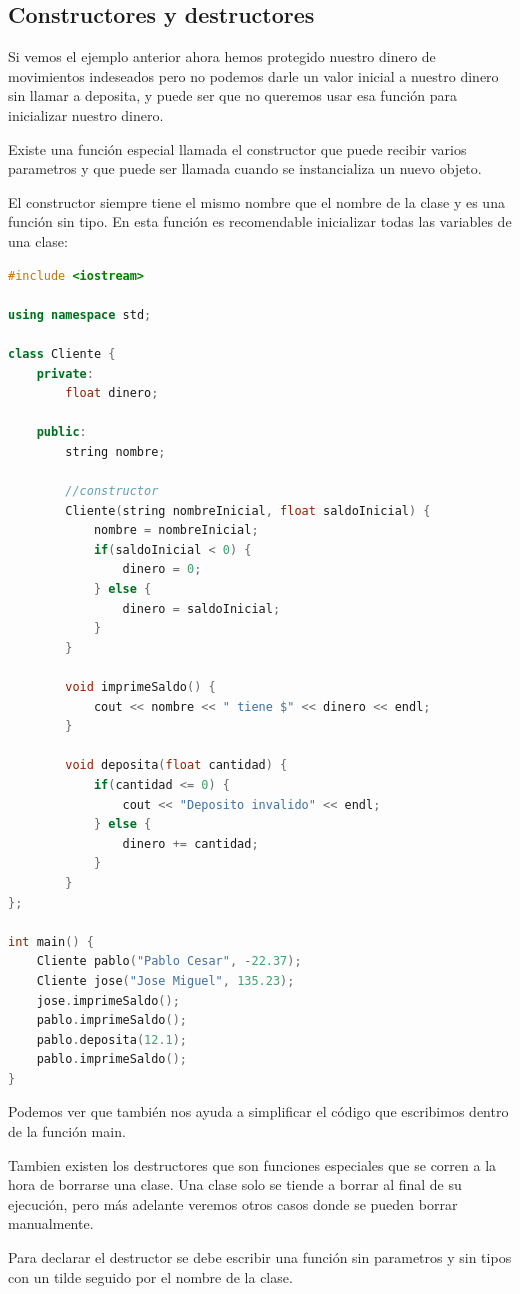 \documentclass{article}
\begin{document}
\subsection{Constructores y destructores}

Si vemos el ejemplo anterior ahora hemos protegido nuestro dinero de movimientos indeseados pero no podemos darle un valor inicial a nuestro dinero sin llamar a deposita, y puede ser que no queremos usar esa función para inicializar nuestro dinero.

Existe una función especial llamada el constructor que puede recibir varios parametros y que puede ser llamada cuando se instancializa un nuevo objeto.

El constructor siempre tiene el mismo nombre que el nombre de la clase y es una función sin tipo. En esta función es recomendable inicializar todas las variables de una clase:

\begin{lstlisting}[language=C++, title=Constructores]
#include <iostream>

using namespace std;

class Cliente {
	private:
		float dinero;

	public:
		string nombre;

		//constructor
		Cliente(string nombreInicial, float saldoInicial) {
			nombre = nombreInicial;
			if(saldoInicial < 0) {
				dinero = 0;
			} else {
				dinero = saldoInicial;
			}
		}

		void imprimeSaldo() {
			cout << nombre << " tiene $" << dinero << endl;
		}

		void deposita(float cantidad) {
			if(cantidad <= 0) {
				cout << "Deposito invalido" << endl;
			} else {
				dinero += cantidad;
			}
		}
};

int main() {
	Cliente pablo("Pablo Cesar", -22.37);
	Cliente jose("Jose Miguel", 135.23);
	jose.imprimeSaldo();
	pablo.imprimeSaldo();
	pablo.deposita(12.1);
	pablo.imprimeSaldo();
}
\end{lstlisting}

Podemos ver que también nos ayuda a simplificar el código que escribimos dentro de la función main.

Tambien existen los destructores que son funciones especiales que se corren a la hora de borrarse una clase. Una clase solo se tiende a borrar al final de su ejecución, pero más adelante veremos otros casos donde se pueden borrar manualmente.

Para declarar el destructor se debe escribir una función sin parametros y sin tipos con un tilde seguido por el nombre de la clase.
\end{document}
